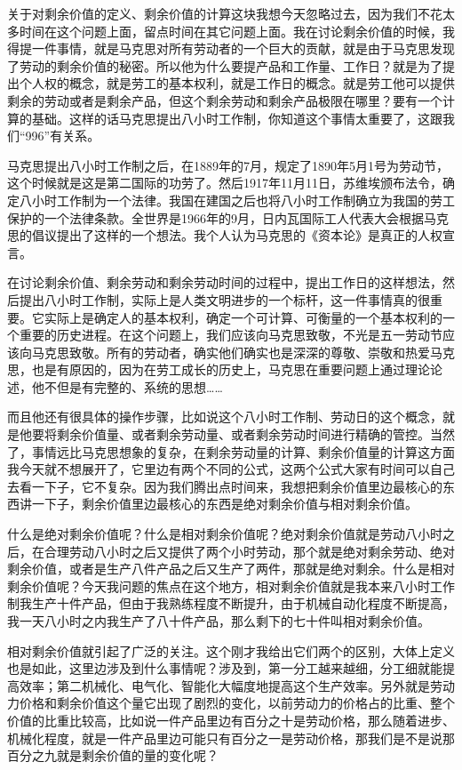 \documentclass[UTF8, 12pt, a4paper]{ctexrep}
\begin{document}
关于对剩余价值的定义、剩余价值的计算这块我想今天忽略过去，因为我们不花太多时间在这个问题上面，留点时间在其它问题上面。我在讨论剩余价值的时候，我得提一件事情，就是马克思对所有劳动者的一个巨大的贡献，就是由于马克思发现了劳动的剩余价值的秘密。所以他为什么要提产品和工作量、工作日？就是为了提出个人权的概念，就是劳工的基本权利，就是工作日的概念。就是劳工他可以提供剩余的劳动或者是剩余产品，但这个剩余劳动和剩余产品极限在哪里？要有一个计算的基础。这样的话马克思提出八小时工作制，你知道这个事情太重要了，这跟我们“996”有关系。

马克思提出八小时工作制之后，在1889年的7月，规定了1890年5月1号为劳动节，这个时候就是这是第二国际的功劳了。然后1917年11月11日，苏维埃颁布法令，确定八小时工作制为一个法律。我国在建国之后也将八小时工作制确立为我国的劳工保护的一个法律条款。全世界是1966年的9月，日内瓦国际工人代表大会根据马克思的倡议提出了这样的一个想法。我个人认为马克思的《资本论》是真正的人权宣言。

在讨论剩余价值、剩余劳动和剩余劳动时间的过程中，提出工作日的这样想法，然后提出八小时工作制，实际上是人类文明进步的一个标杆，这一件事情真的很重要。它实际上是确定人的基本权利，确定一个可计算、可衡量的一个基本权利的一个重要的历史进程。在这个问题上，我们应该向马克思致敬，不光是五一劳动节应该向马克思致敬。所有的劳动者，确实他们确实也是深深的尊敬、崇敬和热爱马克思，也是有原因的，因为在劳工成长的历史上，马克思在重要问题上通过理论论述，他不但是有完整的、系统的思想……

而且他还有很具体的操作步骤，比如说这个八小时工作制、劳动日的这个概念，就是他要将剩余价值量、或者剩余劳动量、或者剩余劳动时间进行精确的管控。当然了，事情远比马克思想象的复杂，在剩余劳动量的计算、剩余价值量的计算这方面我今天就不想展开了，它里边有两个不同的公式，这两个公式大家有时间可以自己去看一下子，它不复杂。因为我们腾出点时间来，我想把剩余价值里边最核心的东西讲一下子，剩余价值里边最核心的东西是绝对剩余价值与相对剩余价值。

什么是绝对剩余价值呢？什么是相对剩余价值呢？绝对剩余价值就是劳动八小时之后，在合理劳动八小时之后又提供了两个小时劳动，那个就是绝对剩余劳动、绝对剩余价值，或者是生产八件产品之后又生产了两件，那就是绝对剩余。什么是相对剩余价值呢？今天我问题的焦点在这个地方，相对剩余价值就是我本来八小时工作制我生产十件产品，但由于我熟练程度不断提升，由于机械自动化程度不断提高，我一天八小时之内我生产了八十件产品，那么剩下的七十件叫相对剩余价值。

相对剩余价值就引起了广泛的关注。这个刚才我给出它们两个的区别，大体上定义也是如此，这里边涉及到什么事情呢？涉及到，第一分工越来越细，分工细就能提高效率；第二机械化、电气化、智能化大幅度地提高这个生产效率。另外就是劳动力价格和剩余价值这个量它出现了剧烈的变化，以前劳动力的价格占的比重、整个价值的比重比较高，比如说一件产品里边有百分之十是劳动价格，那么随着进步、机械化程度，就是一件产品里边可能只有百分之一是劳动价格，那我们是不是说那百分之九就是剩余价值的量的变化呢？
\end{document}
